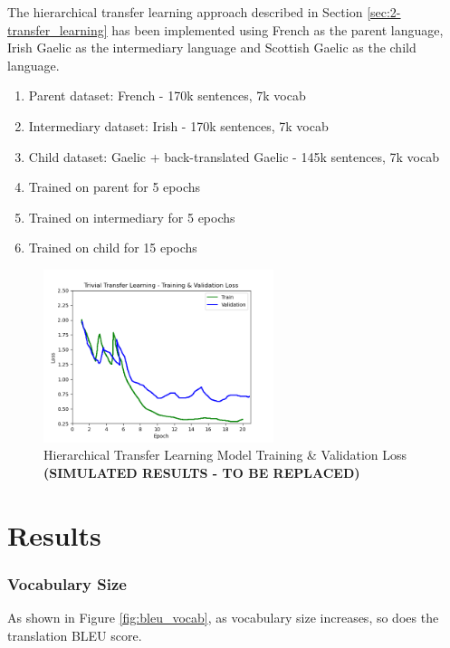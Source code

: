 The hierarchical transfer learning approach described in Section \ref{sec:2-transfer_learning} has been implemented using French as the parent language, Irish Gaelic as the intermediary language and Scottish Gaelic as the child language.

\begin{enumerate}
    \item Parent dataset: French - 170k sentences, 7k vocab
    \item Intermediary dataset: Irish - 170k sentences, 7k vocab
    \item Child dataset: Gaelic + back-translated Gaelic - 145k sentences, 7k vocab
    \item Trained on parent for 5 epochs
    \item Trained on intermediary for 5 epochs
    \item Trained on child for 15 epochs
\end{enumerate}

\begin{figure}[ht!]
\centering
\includegraphics[width=0.6\textwidth]{media/experiments/loss/loss_hierarchical.png}
\captionsetup{justification=centering}
\caption[Baseline Model Training \& Validation Loss]{Hierarchical Transfer Learning Model Training \& Validation Loss \\ \textbf{(SIMULATED RESULTS - TO BE REPLACED)}}
\label{fig:loss_hierarchical}
\end{figure}

\section{Results}

\subsubsection{Vocabulary Size}
As shown in Figure \ref{fig:bleu_vocab}, as vocabulary size increases, so does the translation \acrshort{BLEU} score.

